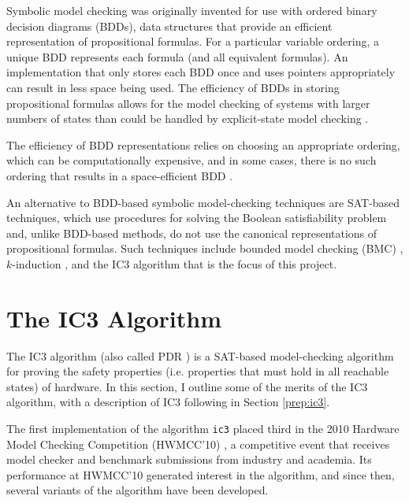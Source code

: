 \documentclass[12pt,a4paper,twoside,openright]{report}
\begin{document}
Symbolic model checking was originally invented for use with ordered
binary decision diagrams (BDDs), data structures that provide an efficient
representation of propositional formulas. For a particular variable
ordering, a unique BDD represents each formula (and all equivalent formulas).
An implementation that only stores each BDD once and uses pointers appropriately
can result in less space being used.
The efficiency of BDDs in storing propositional formulas allows for the model
checking of systems with larger numbers of states than could be handled
by explicit-state model checking \cite{mcmillan92}.

The efficiency of BDD representations relies on choosing an appropriate
ordering, which can be computationally expensive, and in some cases,
there is no such ordering that results in a space-efficient BDD
\cite{biere99a}.

An alternative to BDD-based symbolic model-checking techniques are SAT-based
techniques, which use procedures for solving the Boolean satisfiability
problem and, unlike BDD-based methods, do not use the canonical representations
of propositional formulas.
Such techniques include bounded model checking (BMC)
\cite{biere99a}, $k$-induction \cite{sheeran00},
and the IC3 algorithm that is the focus of this project.


\section{The IC3 Algorithm}


The IC3 algorithm (also called PDR \cite{een11}) is a SAT-based model-checking
algorithm for proving the safety properties (i.e. properties that must hold
in all reachable states) of hardware. In this section, I outline some of the
merits of the IC3 algorithm, with a description of IC3 following in Section
\ref{prep:ic3}.

The first implementation of the algorithm \verb,ic3, placed third in
the 2010 Hardware Model Checking Competition (HWMCC'10) \cite{hwmcc10},
a competitive event that receives model checker and benchmark submissions from
industry and
academia. Its performance at HWMCC'10 generated interest in the algorithm, and
since then, several variants of the algorithm have been developed.
\end{document}
